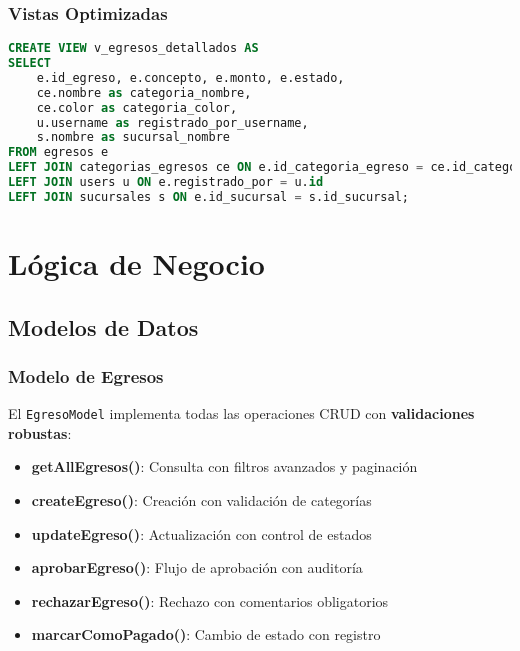 \documentclass[12pt,a4paper]{article}
\newcommand{\highlight}[1]{\textcolor{primaryblue}{\textbf{#1}}}
\newcommand{\success}[1]{\textcolor{secondarygreen}{\textbf{#1}}}
\begin{document}
\subsubsection{Vistas Optimizadas}
\begin{lstlisting}[language=SQL, caption=Vista para reportes de egresos]
CREATE VIEW v_egresos_detallados AS
SELECT 
    e.id_egreso, e.concepto, e.monto, e.estado,
    ce.nombre as categoria_nombre,
    ce.color as categoria_color,
    u.username as registrado_por_username,
    s.nombre as sucursal_nombre
FROM egresos e
LEFT JOIN categorias_egresos ce ON e.id_categoria_egreso = ce.id_categoria_egreso
LEFT JOIN users u ON e.registrado_por = u.id
LEFT JOIN sucursales s ON e.id_sucursal = s.id_sucursal;
\end{lstlisting}


\section{Lógica de Negocio}

\subsection{Modelos de Datos}

\subsubsection{Modelo de Egresos}
El \texttt{EgresoModel} implementa todas las operaciones CRUD con \highlight{validaciones robustas}:

\begin{itemize}[leftmargin=*]
    \item \success{getAllEgresos()}: Consulta con filtros avanzados y paginación
    \item \success{createEgreso()}: Creación con validación de categorías
    \item \success{updateEgreso()}: Actualización con control de estados
    \item \success{aprobarEgreso()}: Flujo de aprobación con auditoría
    \item \success{rechazarEgreso()}: Rechazo con comentarios obligatorios
    \item \success{marcarComoPagado()}: Cambio de estado con registro
\end{itemize}
\end{document}
